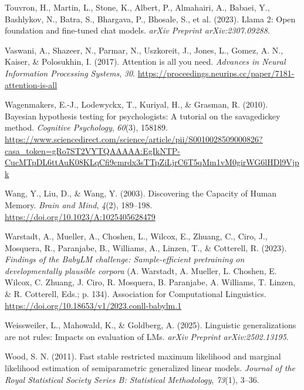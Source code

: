 \documentclass[
  12pt,
  letterpaper,
]{scrreprt}
\newlength{\cslhangindent}
\newenvironment{CSLReferences}[2] %
 {\begin{list}{}{%
  \setlength{\itemindent}{0pt}
  \setlength{\leftmargin}{0pt}
  \setlength{\parsep}{0pt}
  \ifodd #1
   \setlength{\leftmargin}{\cslhangindent}
   \setlength{\itemindent}{-1\cslhangindent}
  \fi
  \setlength{\itemsep}{#2\baselineskip}}}
 {\end{list}}
\begin{document}
\begin{CSLReferences}{1}{0}
Touvron, H., Martin, L., Stone, K., Albert, P., Almahairi, A., Babaei,
Y., Bashlykov, N., Batra, S., Bhargava, P., Bhosale, S., et al. (2023).
Llama 2: Open foundation and fine-tuned chat models. \emph{arXiv
Preprint arXiv:2307.09288}.

Vaswani, A., Shazeer, N., Parmar, N., Uszkoreit, J., Jones, L., Gomez,
A. N., Kaiser, \& Polosukhin, I. (2017). Attention is all you need.
\emph{Advances in Neural Information Processing Systems}, \emph{30}.
\url{https://proceedings.neurips.cc/paper/7181-attention-is-all}

Wagenmakers, E.-J., Lodewyckx, T., Kuriyal, H., \& Grasman, R. (2010).
Bayesian hypothesis testing for psychologists: A tutorial on the
savage{\textendash}dickey method. \emph{Cognitive Psychology},
\emph{60}(3), 158189.
\url{https://www.sciencedirect.com/science/article/pii/S0010028509000826?casa_token=gRo7ST2VYTQAAAAA:EgIkNTP-CucMTpDL6ttAuK08KLqCfi9cmrdx3sTTpZiLjrC6T5qMm1vM0girWG6lHDl9Vjpk}

Wang, Y., Liu, D., \& Wang, Y. (2003). Discovering the Capacity of Human
Memory. \emph{Brain and Mind}, \emph{4}(2), 189--198.
\url{https://doi.org/10.1023/A:1025405628479}

Warstadt, A., Mueller, A., Choshen, L., Wilcox, E., Zhuang, C., Ciro,
J., Mosquera, R., Paranjabe, B., Williams, A., Linzen, T., \& Cotterell,
R. (2023). \emph{Findings of the BabyLM challenge: Sample-efficient
pretraining on developmentally plausible corpora} (A. Warstadt, A.
Mueller, L. Choshen, E. Wilcox, C. Zhuang, J. Ciro, R. Mosquera, B.
Paranjabe, A. Williams, T. Linzen, \& R. Cotterell, Eds.; p. 134).
Association for Computational Linguistics.
\url{https://doi.org/10.18653/v1/2023.conll-babylm.1}

Weissweiler, L., Mahowald, K., \& Goldberg, A. (2025). Linguistic
generalizations are not rules: Impacts on evaluation of LMs. \emph{arXiv
Preprint arXiv:2502.13195}.

Wood, S. N. (2011). Fast stable restricted maximum likelihood and
marginal likelihood estimation of semiparametric generalized linear
models. \emph{Journal of the Royal Statistical Society Series B:
Statistical Methodology}, \emph{73}(1), 3--36.


\end{CSLReferences}
\end{document}
